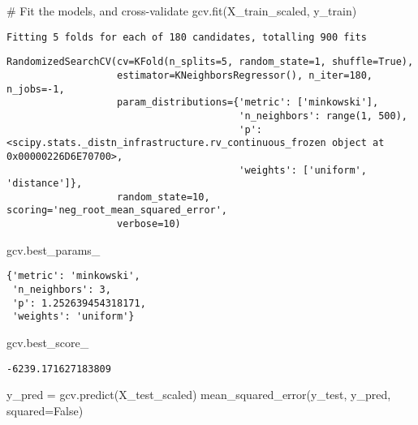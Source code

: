 \documentclass[
  letterpaper,
  DIV=11,
  numbers=noendperiod]{scrreprt}
\newenvironment{Shaded}{\begin{snugshade}}{\end{snugshade}}
\newcommand{\CommentTok}[1]{\textcolor[rgb]{0.37,0.37,0.37}{#1}}
\newcommand{\NormalTok}[1]{\textcolor[rgb]{0.00,0.23,0.31}{#1}}
\newcommand{\OperatorTok}[1]{\textcolor[rgb]{0.37,0.37,0.37}{#1}}
\newcommand{\VariableTok}[1]{\textcolor[rgb]{0.07,0.07,0.07}{#1}}
\begin{document}
\begin{Shaded}
\begin{Highlighting}[]
\CommentTok{\# Fit the models, and cross{-}validate}
\NormalTok{gcv.fit(X\_train\_scaled, y\_train)}
\end{Highlighting}
\end{Shaded}

\begin{verbatim}
Fitting 5 folds for each of 180 candidates, totalling 900 fits
\end{verbatim}

\begin{verbatim}
RandomizedSearchCV(cv=KFold(n_splits=5, random_state=1, shuffle=True),
                   estimator=KNeighborsRegressor(), n_iter=180, n_jobs=-1,
                   param_distributions={'metric': ['minkowski'],
                                        'n_neighbors': range(1, 500),
                                        'p': <scipy.stats._distn_infrastructure.rv_continuous_frozen object at 0x00000226D6E70700>,
                                        'weights': ['uniform', 'distance']},
                   random_state=10, scoring='neg_root_mean_squared_error',
                   verbose=10)
\end{verbatim}

\begin{Shaded}
\begin{Highlighting}[]
\NormalTok{gcv.best\_params\_}
\end{Highlighting}
\end{Shaded}

\begin{verbatim}
{'metric': 'minkowski',
 'n_neighbors': 3,
 'p': 1.252639454318171,
 'weights': 'uniform'}
\end{verbatim}

\begin{Shaded}
\begin{Highlighting}[]
\NormalTok{gcv.best\_score\_}
\end{Highlighting}
\end{Shaded}

\begin{verbatim}
-6239.171627183809
\end{verbatim}

\begin{Shaded}
\begin{Highlighting}[]
\NormalTok{y\_pred }\OperatorTok{=}\NormalTok{ gcv.predict(X\_test\_scaled)}
\NormalTok{mean\_squared\_error(y\_test, y\_pred, squared}\OperatorTok{=}\VariableTok{False}\NormalTok{)}
\end{Highlighting}
\end{Shaded}
\end{document}
